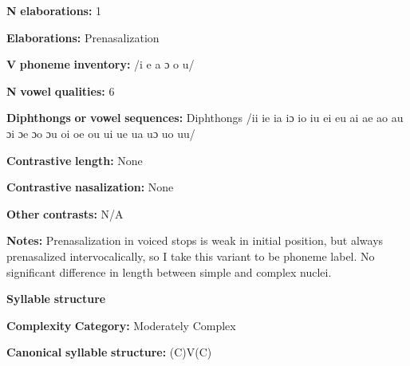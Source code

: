\documentclass[output=paper]{langsci/langscibook}
\begin{document}
\begin{styleBody}
\textbf{N} \textbf{elaborations:} 1
\end{styleBody}

\begin{styleBody}
\textbf{Elaborations:} Prenasalization
\end{styleBody}

\begin{styleBody}
\textbf{V} \textbf{phoneme} \textbf{inventory:} /i e a ɔ o u/
\end{styleBody}

\begin{styleBody}
\textbf{N} \textbf{vowel} \textbf{qualities:} 6
\end{styleBody}

\begin{styleBody}
\textbf{Diphthongs} \textbf{or} \textbf{vowel} \textbf{sequences:} Diphthongs /ii ie ia iɔ io iu ei eu ai ae ao au ɔi ɔe ɔo ɔu oi oe ou ui ue ua uɔ uo uu/
\end{styleBody}

\begin{styleBody}
\textbf{Contrastive} \textbf{length:} None
\end{styleBody}

\begin{styleBody}
\textbf{Contrastive} \textbf{nasalization:} None
\end{styleBody}

\begin{styleBody}
\textbf{Other} \textbf{contrasts:} N/A
\end{styleBody}

\begin{styleBody}
\textbf{Notes:} Prenasalization in voiced stops is weak in initial position, but always prenasalized intervocalically, so I take this variant to be phoneme label. No significant difference in length between simple and complex nuclei.
\end{styleBody}

\begin{styleBody}
\textbf{Syllable} \textbf{structure}
\end{styleBody}

\begin{styleBody}
\textbf{Complexity} \textbf{Category:} Moderately Complex
\end{styleBody}

\begin{styleBody}
\textbf{Canonical} \textbf{syllable} \textbf{structure:} (C)V(C) \citep[14-18]{McElhanon1970}
\end{styleBody}
\end{document}
